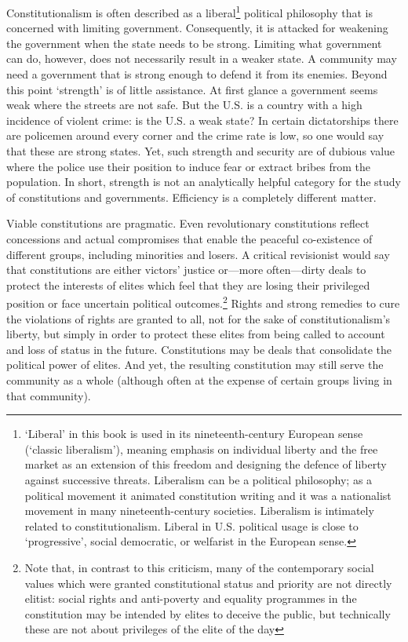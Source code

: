 \begin{multicols}{2}
\vspace{-.1cm}

\noi
Constitutionalism is often described as a liberal\footnote{‘Liberal’ in this book is used in its nineteenth-century European sense (‘classic liberalism’), meaning emphasis on individual liberty and the free market as an extension of this freedom and designing the defence of liberty against successive threats. Liberalism can be a political philosophy; as a political movement it animated
constitution writing and it was a nationalist movement in many nineteenth-century societies. Liberalism is
intimately related to constitutionalism. Liberal in U.S. political usage is close to ‘progressive’, social
democratic, or welfarist in the European sense.} political philosophy that is concerned with
limiting government. Consequently, it is attacked for weakening the government when the state needs to be strong. Limiting what government can do, however, does not necessarily
result in a weaker state. A community may need a government that is strong enough to
defend it from its enemies. Beyond this point ‘strength’ is of little assistance. At first glance
a government seems weak where the streets are not safe. But the U.S. is a country with a high
incidence of violent crime: is the U.S. a weak state? In certain dictatorships there are
policemen around every corner and the crime rate is low, so one would say that these are
strong states. Yet, such strength and security are of dubious value where the police use their
position to induce fear or extract bribes from the population. In short, strength is not an
analytically helpful category for the study of constitutions and governments. Efficiency is a
completely different matter.

 \vspace{-.15cm}

\noi
Viable constitutions are pragmatic. Even revolutionary constitutions reflect concessions and
actual compromises that enable the peaceful co-existence of different groups, including
minorities and losers. A critical revisionist would say that constitutions are either victors’
justice or—more often—dirty deals to protect the interests of elites which feel that they are
losing their privileged position or face uncertain political outcomes.\footnote{Note that, in contrast to this criticism, many of the contemporary social values which were granted constitutional status and priority are not directly elitist: social rights and anti-poverty and equality programmes in the constitution may be intended by elites to deceive the public, but technically these are not about privileges of the elite of the day}  Rights and strong remedies to cure the violations of rights are granted to all, not for the sake of
constitutionalism’s liberty, but simply in order to protect these elites from being called to
account and loss of status in the future. Constitutions may be deals that consolidate the
political power of elites. And yet, the resulting constitution may still serve the community as
a whole (although often at the expense of certain groups living in that community).


\end{multicols}
